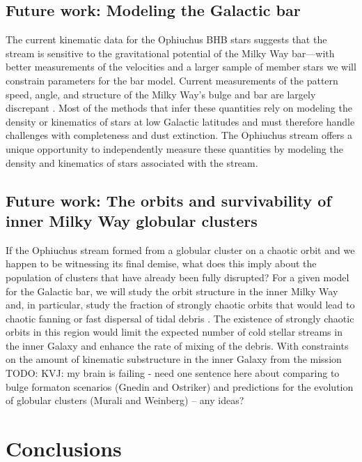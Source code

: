 \documentclass[letterpaper,12pt,preprint]{aastex}
\newcommand{\todo}[1]{{\color{red} TODO: #1}}
\begin{document}
\subsection{Future work: Modeling the Galactic bar}

The current kinematic data for the Ophiuchus BHB stars suggests that the stream is sensitive to the gravitational potential of the Milky Way bar---with better measurements of the velocities and a larger sample of member stars we will constrain parameters for the bar model. Current measurements of the pattern speed, angle, and structure of the Milky Way's bulge and bar are largely discrepant \citep[e.g.,][]{wang12, wang13, wegg13, antoja14}. Most of the methods that infer these quantities rely on modeling the density or kinematics of stars at low Galactic latitudes and must therefore handle challenges with completeness and dust extinction. The Ophiuchus stream offers a unique opportunity to independently measure these quantities by modeling the density and kinematics of stars associated with the stream. 

\subsection{Future work: The orbits and survivability of inner Milky Way globular clusters}

If the Ophiuchus stream formed from a globular cluster on a chaotic orbit and we happen to be witnessing its final demise, what does this imply about the population of clusters that have already been fully disrupted? For a given model for the Galactic bar, we will study the orbit structure in the inner Milky Way and, in particular, study the fraction of strongly chaotic orbits that would lead to chaotic fanning or fast dispersal of tidal debris \citep[e.g.,][]{jung15}. The existence of strongly chaotic orbits in this region would limit the expected number of cold stellar streams in the inner Galaxy and enhance the rate of mixing of the debris. With constraints on the amount of kinematic substructure in the inner Galaxy from the  mission \todo{KVJ: my brain is failing - need one sentence here about comparing to bulge formaton scenarios (Gnedin and Ostriker) and predictions for the evolution of globular clusters (Murali and Weinberg) -- any ideas?}

\section{Conclusions}\label{sec:conclusions}
\end{document}
